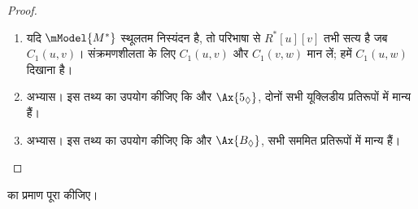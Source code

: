 \documentclass[../../../include/open-logic-section]{subfiles}
\begin{document}
\begin{proof}
\begin{enumerate}
  \item यदि $\mModel{M^*}$ स्थूलतम निस्यंदन है, तो परिभाषा से
    $R^*[u][v]$ तभी सत्य है जब $C_1(u,v)$। संक्रमणशीलता के लिए $C_1(u,v)$
    और $C_1(v,w)$ मान लें; हमें $C_1(u,w)$ दिखाना है।
  \item अभ्यास। इस तथ्य का उपयोग कीजिए कि  और $\Ax{5_\Diamond}$,
    दोनों सभी यूक्लिडीय प्रतिरूपों में मान्य हैं।
  \item अभ्यास। इस तथ्य का उपयोग कीजिए कि  और $\Ax{B_\Diamond}$,
    सभी सममित प्रतिरूपों में मान्य हैं।
\end{enumerate}
\end{proof}

\begin{prob}
   का प्रमाण पूरा कीजिए।
\end{prob}
\end{document}
